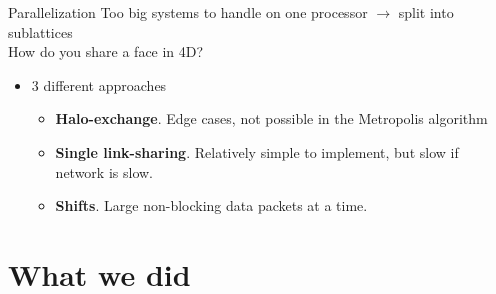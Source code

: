 \documentclass[10pt]{beamer}
\begin{document}
\begin{frame}{Parallelization}
	Too big systems to handle on one processor $\rightarrow$ split into sublattices \\
	How do you share a face in 4D?
	\begin{itemize}%
		\item 3 different approaches
		\begin{itemize}%
			\item \textbf{Halo-exchange}. Edge cases, not possible in the Metropolis algorithm
			\item \textbf{Single link-sharing}. Relatively simple to implement, but slow if network is slow.
			\item \textbf{Shifts}. Large non-blocking data packets at a time.
		\end{itemize}
		
	\end{itemize}
\end{frame}

\section{What we did}
\end{document}
